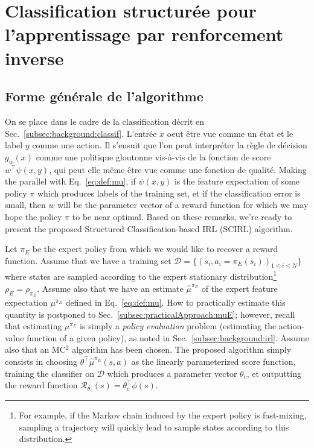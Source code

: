 \documentclass[english,utf8]{./hermes-journal}
\newcommand{\R}{\mathcal{R}}
\newcommand{\D}{\mathcal{D}}
\begin{document}
\section{Classification structurée pour l'apprentissage par renforcement inverse} \label{sec:scirl}

\subsection{Forme générale de l'algorithme}
\label{subsec:scirl:algo}

On se place dans le cadre de la classification décrit en Sec.~\ref{subsec:background:classif}. L'entrée $x$ oeut être vue comme un état et le label $y$ comme une action. Il s'ensuit que l'on peut interpréter la règle de décision 
$g_w(x)$ comme une politique gloutonne vis-à-vis de la fonction de score $w^\top \psi(x,y)$, qui peut elle même être vue comme une fonction de qualité. Making the parallel with
Eq.~\eqref{eq:def:mu}, if $\psi(x,y)$ is the feature expectation of
some policy $\pi$ which produces labels of the training set, et if
the classification error is small, then $w$ will be the parameter
vector of a reward function for which we may hope the policy $\pi$
to be near optimal. Based on these remarks, we're ready to present
the proposed Structured Classification-based IRL (SCIRL) algorithm.

Let $\pi_E$ be the expert policy from which we would like to recover
a reward function. Assume that we have a training set $\D =
\{(s_i,a_i=\pi_E(s_i))_{1\leq i\leq N}\}$ where states are sampled
according to the expert stationary distribution\footnote{For
example, if the Markov chain induced by the expert policy is
fast-mixing, sampling a trajectory will quickly lead to sample
states according to this distribution.} $\rho_E = \rho_{\pi_E}$.
Assume also that we have an estimate $\hat{\mu}^{\pi_E}$ of the
expert feature expectation $\mu^{\pi_E}$ defined in
Eq.~\eqref{eq:def:mu}. How to practically estimate this quantity is
postponed to Sec.~\ref{subsec:practicalApproach:muE}; however,
recall that estimating $\mu^{\pi_E}$ is simply a \emph{policy
evaluation} problem (estimating the action-value function of a given
policy), as noted in Sec.~\ref{subsec:background:irl}. Assume also
that an MC$^2$ algorithm has been chosen. The proposed algorithm
simply consists in choosing $\theta^\top\hat{\mu}^{\pi_E}(s,a)$ as
the linearly parameterized score function, training the classifier
on $\D$ which produces a parameter vector $\theta_c$, et outputting
the reward function $\R_{\theta_c}(s) = \theta_c^\top \phi(s)$.
\end{document}

